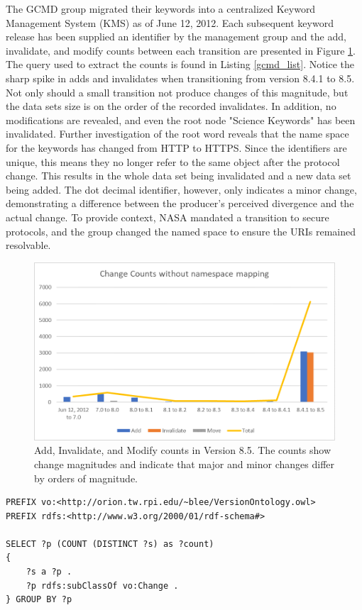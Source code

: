 The GCMD group migrated their keywords into a centralized Keyword Management System (KMS) as of June 12, 2012.
Each subsequent keyword release has been supplied an identifier by the management group and the add, invalidate, and modify counts between each transition are presented in Figure \ref{GCMDC1}.
The query used to extract the counts is found in Listing \ref{gcmd_list}.
Notice the sharp spike in adds and invalidates when transitioning from version 8.4.1 to 8.5.
Not only should a small transition not produce changes of this magnitude, but the data sets size is on the order of the recorded invalidates.
In addition, no modifications are revealed, and even the root node "Science Keywords" has been invalidated.
Further investigation of the root word reveals that the name space for the keywords has changed from HTTP to HTTPS.
Since the identifiers are unique, this means they no longer refer to the same object after the protocol change.
This results in the whole data set being invalidated and a new data set being added.
The dot decimal identifier, however, only indicates a minor change, demonstrating a difference between the producer's perceived divergence and the actual change.
To provide context, NASA mandated a transition to secure protocols, and the group changed the named space to ensure the URIs remained resolvable.

\begin{figure}%
	\centering
	\includegraphics[scale=1]{figures/GCMDChart1.png}
	\caption{Add, Invalidate, and Modify counts in Version 8.5.  The counts show change magnitudes and indicate that major and minor changes differ by orders of magnitude.}
	\label{GCMDC1}
\end{figure}

\hfill \break
\begin{lstlisting}[language=SPARQL, caption=This query compiles the counts for each subclass of Change in a GCMD versioning graph,label=gcmd_list]
PREFIX vo:<http://orion.tw.rpi.edu/~blee/VersionOntology.owl>
PREFIX rdfs:<http://www.w3.org/2000/01/rdf-schema#>

SELECT ?p (COUNT (DISTINCT ?s) as ?count)
{
	?s a ?p .
	?p rdfs:subClassOf vo:Change .
} GROUP BY ?p
\end{lstlisting}

